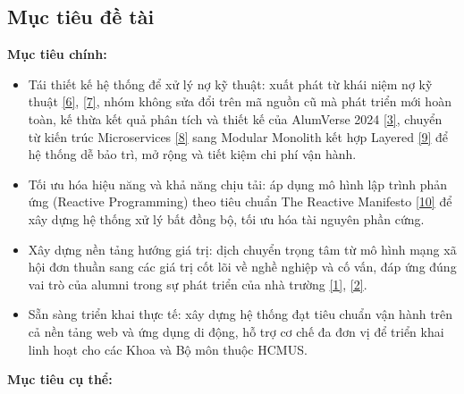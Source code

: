 \documentclass[12pt,a4paper]{article}
\begin{document}
\subsection{Mục tiêu đề tài}
\vspace{-4pt}
\textbf{Mục tiêu chính:}
\vspace{-8pt}
\begin{itemize}
    \item Tái thiết kế hệ thống để xử lý nợ kỹ thuật: xuất phát từ khái niệm nợ kỹ thuật \hyperref[ref:cunningham]{[6]}, \hyperref[ref:fowler]{[7]}, nhóm không sửa đổi trên mã nguồn cũ mà phát triển mới hoàn toàn, kế thừa kết quả phân tích và thiết kế của AlumVerse 2024 \hyperref[ref:alumverse]{[3]}, chuyển từ kiến trúc Microservices \hyperref[ref:microservices]{[8]} sang Modular Monolith kết hợp Layered \hyperref[ref:poeaa]{[9]} để hệ thống dễ bảo trì, mở rộng và tiết kiệm chi phí vận hành.
    \item Tối ưu hóa hiệu năng và khả năng chịu tải: áp dụng mô hình lập trình phản ứng (Reactive Programming) theo tiêu chuẩn The Reactive Manifesto \hyperref[ref:reactive]{[10]} để xây dựng hệ thống xử lý bất đồng bộ, tối ưu hóa tài nguyên phần cứng.
    \item Xây dựng nền tảng hướng giá trị: dịch chuyển trọng tâm từ mô hình mạng xã hội đơn thuần sang các giá trị cốt lõi về nghề nghiệp và cố vấn, đáp ứng đúng vai trò của alumni trong sự phát triển của nhà trường \hyperref[ref:obeng]{[1]}, \hyperref[ref:unisel]{[2]}.
    \item Sẵn sàng triển khai thực tế: xây dựng hệ thống đạt tiêu chuẩn vận hành trên cả nền tảng web và ứng dụng di động, hỗ trợ cơ chế đa đơn vị để triển khai linh hoạt cho các Khoa và Bộ môn thuộc HCMUS.
\end{itemize}
\textbf{Mục tiêu cụ thể:}
\vspace{-8pt}
\end{document}
